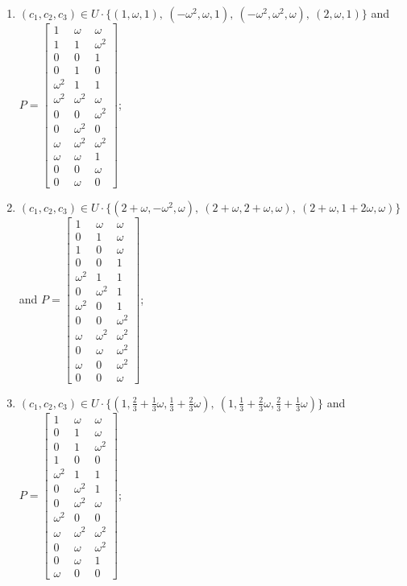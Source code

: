 \begin{enumerate}
\item[(f71)\,\newitem] $(c_1,c_2,c_3)\in U\cdot\{(1,\omega,1),\allowbreak\ (-\omega^2,\omega,1),\allowbreak\ (-\omega^2,\omega^2,\omega),\allowbreak\ (2,\omega,1)\}$ and $P=\begin{bmatrix}1&\omega&\omega\\1&1&\omega^2\\0&0&1\\0&1&0\\\omega^2&1&1\\\omega^2&\omega^2&\omega\\0&0&\omega^2\\0&\omega^2&0\\\omega&\omega^2&\omega^2\\\omega&\omega&1\\0&0&\omega\\0&\omega&0\end{bmatrix}$;
\item[(f72)\,\newitem] $(c_1,c_2,c_3)\in U\cdot\{(2+\omega,-\omega^2,\omega),\allowbreak\ (2+\omega,2+\omega,\omega),\allowbreak\ (2+\omega,1+2\omega,\omega)\}$ and $P=\begin{bmatrix}1&\omega&\omega\\0&1&\omega\\1&0&\omega\\0&0&1\\\omega^2&1&1\\0&\omega^2&1\\\omega^2&0&1\\0&0&\omega^2\\\omega&\omega^2&\omega^2\\0&\omega&\omega^2\\\omega&0&\omega^2\\0&0&\omega\end{bmatrix}$;
\item[(f73)\,\newitem] $(c_1,c_2,c_3)\in U\cdot\{(1,\tfrac{2}{3}+\tfrac{1}{3}\omega,\tfrac{1}{3}+\tfrac{2}{3}\omega),\allowbreak\ (1,\tfrac{1}{3}+\tfrac{2}{3}\omega,\tfrac{2}{3}+\tfrac{1}{3}\omega)\}$ and $P=\begin{bmatrix}1&\omega&\omega\\0&1&\omega\\0&1&\omega^2\\1&0&0\\\omega^2&1&1\\0&\omega^2&1\\0&\omega^2&\omega\\\omega^2&0&0\\\omega&\omega^2&\omega^2\\0&\omega&\omega^2\\0&\omega&1\\\omega&0&0\end{bmatrix}$;

\end{enumerate}

